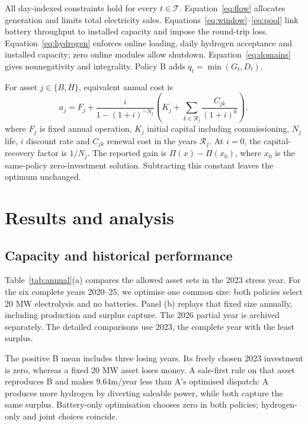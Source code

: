 All day-indexed constraints hold for every \(t\in\mathcal T\).
Equation~\eqref{eq:flow} allocates generation and limits total electricity
sales. Equations~\eqref{eq:window}--\eqref{eq:pool} link battery throughput
to installed capacity and impose the round-trip loss. Equation~\eqref{eq:hydrogen}
enforces online loading, daily hydrogen acceptance and installed capacity;
zero online modules allow shutdown. Equation~\eqref{eq:domains} gives
nonnegativity and integrality. Policy B adds \(q_t=\min(G_t,D_t)\).

For asset \(j\in\{B,H\}\), equivalent annual cost is
\begin{equation}
a_j=F_j+\frac{i}{1-(1+i)^{-N_j}}
 \left(K_j+\sum_{k\in\mathcal R_j}\frac{C_{jk}}{(1+i)^k}\right),
\label{eq:annualcost}
\end{equation}
where \(F_j\) is fixed annual operation, \(K_j\) initial capital including
commissioning, \(N_j\) life, \(i\) discount rate and \(C_{jk}\) renewal cost
in the years \(\mathcal R_j\). At \(i=0\), the capital-recovery factor is
\(1/N_j\). The reported gain is \(\Pi(x)-\Pi(x_0)\), where \(x_0\)
is the same-policy zero-investment solution. Subtracting this constant
leaves the optimum unchanged.

\section{Results and analysis}\label{sec:results1}
\subsection{Capacity and historical performance}
Table~\ref{tab:annual}(a) compares the allowed asset sets in the 2023
stress year. For the six complete years 2020--25, we optimise one common
size: both policies select 20 MW electrolysis and no batteries.
Panel (b) replays that fixed size annually, including production and surplus
capture. The 2026 partial year is archived separately. The detailed
comparisons use 2023, the complete year with the least surplus.

The positive B mean includes three losing years. Its freely chosen 2023
investment is zero, whereas a fixed 20 MW asset loses money. A sale-first
rule on that asset reproduces B and makes \gbp 9.64m/year less than A's
optimised dispatch: A produces more hydrogen by diverting saleable power,
while both capture the same surplus. Battery-only optimisation chooses zero
in both policies; hydrogen-only and joint choices coincide.


